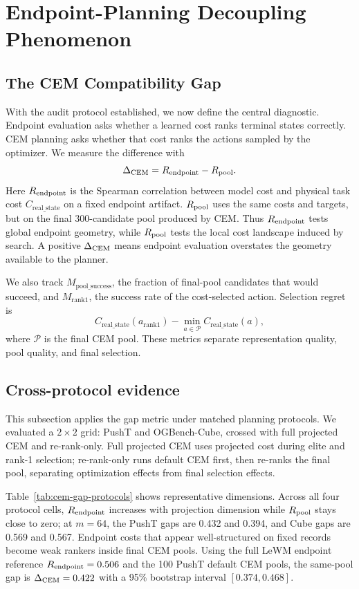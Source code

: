 \section{Endpoint-Planning Decoupling Phenomenon}

\subsection{The CEM Compatibility Gap}

With the audit protocol established, we now define the central diagnostic. Endpoint evaluation asks whether a learned cost ranks terminal states correctly. CEM planning asks whether that cost ranks the actions sampled by the optimizer. We measure the difference with
\[
\Delta_\text{CEM} = R_\text{endpoint} - R_\text{pool} .
\]
Here $R_\text{endpoint}$ is the Spearman correlation between model cost and physical task cost $C_\mathrm{real\_state}$ on a fixed endpoint artifact. $R_\text{pool}$ uses the same costs and targets, but on the final 300-candidate pool produced by CEM. Thus $R_\text{endpoint}$ tests global endpoint geometry, while $R_\text{pool}$ tests the local cost landscape induced by search. A positive $\Delta_\text{CEM}$ means endpoint evaluation overstates the geometry available to the planner.

We also track $M_\mathrm{pool\_success}$, the fraction of final-pool candidates that would succeed, and $M_\mathrm{rank1}$, the success rate of the cost-selected action. Selection regret is
\[
C_\mathrm{real\_state}(a_\mathrm{rank1}) -
\min_{a\in \mathcal{P}} C_\mathrm{real\_state}(a),
\]
where $\mathcal{P}$ is the final CEM pool. These metrics separate representation quality, pool quality, and final selection.

\subsection{Cross-protocol evidence}

This subsection applies the gap metric under matched planning protocols. We evaluated a $2\times2$ grid: PushT and OGBench-Cube, crossed with full projected CEM and re-rank-only. Full projected CEM uses projected cost during elite and rank-1 selection; re-rank-only runs default CEM first, then re-ranks the final pool, separating optimization effects from final selection effects.

Table~\ref{tab:cem-gap-protocols} shows representative dimensions. Across all four protocol cells, $R_\text{endpoint}$ increases with projection dimension while $R_\text{pool}$ stays close to zero; at $m=64$, the PushT gaps are 0.432 and 0.394, and Cube gaps are 0.569 and 0.567. Endpoint costs that appear well-structured on fixed records become weak rankers inside final CEM pools. Using the full LeWM endpoint reference $R_\text{endpoint}=0.506$ and the 100 PushT default CEM pools, the same-pool gap is $\Delta_\text{CEM}=0.422$ with a 95\% bootstrap interval $[0.374,0.468]$.

